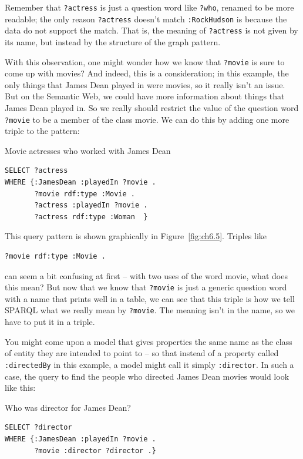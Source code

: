 Remember that \texttt{?actress} is just a question word like \texttt{?who}, renamed to be
more readable; the only reason \texttt{?actress} doesn't match \texttt{:RockHudson} is
because the data do not support the match. That is, the meaning of
\texttt{?actress} is not given by its name, but instead by the structure of the
graph pattern.

With this observation, one might wonder how we know that \texttt{?movie} is sure
to come up with movies? And indeed, this is a consideration; in this
example, the only things that James Dean played in were movies, so it
really isn't an issue. But on the Semantic Web, we could have more
information about things that James Dean played in. So we really should
restrict the value of the question word \texttt{?movie} to be a member of the
class movie. We can do this by adding one more triple to the pattern:

\begin{query}Movie actresses who worked with James Dean\end{query}

\begin{lstlisting}
SELECT ?actress
WHERE {:JamesDean :playedIn ?movie .
       ?movie rdf:type :Movie .
       ?actress :playedIn ?movie .
       ?actress rdf:type :Woman  }
\end{lstlisting}

This query pattern is shown graphically in Figure~\ref{fig:ch6.5}. Triples like

\begin{lstlisting}
?movie rdf:type :Movie .
\end{lstlisting}

can seem a bit confusing at first -- with two uses of the word movie,
what does this mean? But now that we know that \texttt{?movie} is just a generic
question word with a name that prints well in a table, we can see that
this triple is how we tell SPARQL what we really mean by \texttt{?movie}. The
meaning isn't in the name, so we have to put it in a triple.

You might come upon a model that gives properties the same name as the
class of entity they are intended to point to -- so that instead of a
property called \texttt{:directedBy} in this example, a model might call it
simply \texttt{:director}. In such a case, the query to find the people who
directed James Dean movies would look like this:

\begin{query}Who was director for James Dean?\end{query}
\begin{lstlisting}
SELECT ?director
WHERE {:JamesDean :playedIn ?movie .
       ?movie :director ?director .}
\end{lstlisting}


